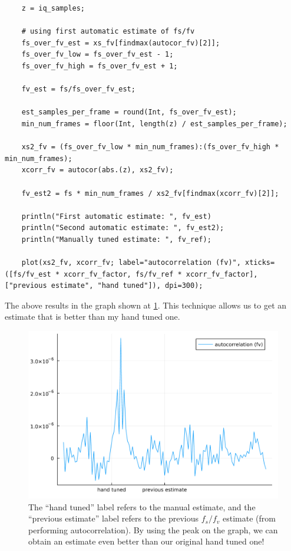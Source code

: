 \documentclass{article}
\begin{document}
\begin{verbatim}
    z = iq_samples;

    # using first automatic estimate of fs/fv
    fs_over_fv_est = xs_fv[findmax(autocor_fv)[2]];
    fs_over_fv_low = fs_over_fv_est - 1;
    fs_over_fv_high = fs_over_fv_est + 1;

    fv_est = fs/fs_over_fv_est;

    est_samples_per_frame = round(Int, fs_over_fv_est);
    min_num_frames = floor(Int, length(z) / est_samples_per_frame);

    xs2_fv = (fs_over_fv_low * min_num_frames):(fs_over_fv_high * min_num_frames);
    xcorr_fv = autocor(abs.(z), xs2_fv);

    fv_est2 = fs * min_num_frames / xs2_fv[findmax(xcorr_fv)[2]];

    println("First automatic estimate: ", fv_est)
    println("Second automatic estimate: ", fv_est2);
    println("Manually tuned estimate: ", fv_ref);

    plot(xs2_fv, xcorr_fv; label="autocorrelation (fv)", xticks=([fs/fv_est * xcorr_fv_factor, fs/fv_ref * xcorr_fv_factor], ["previous estimate", "hand tuned"]), dpi=300);
\end{verbatim}

The above results in the graph shown at \ref{fig:xcorr-fv}. This technique allows us to get an estimate that is better than my hand tuned one.

\begin{figure}
    \centering
    \includegraphics[width=0.95\linewidth]{images/autocor_fv_step2.png}
    \caption{The ``hand tuned'' label refers to the manual estimate, and the ``previous estimate'' label refers to the previous $f_s/f_v$ estimate (from performing autocorrelation). By using the peak on the graph, we can obtain an estimate even better than our original hand tuned one!}
    \label{fig:xcorr-fv}
\end{figure}
\end{document}

